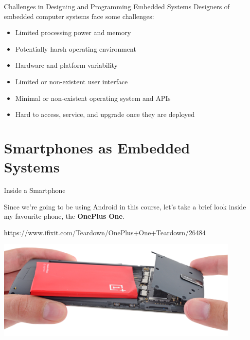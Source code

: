 \documentclass[aspectratio=169]{beamer}
\begin{document}
\begin{frame}{Challenges in Designing and Programming Embedded Systems}
Designers of embedded computer systems face some challenges: \\
\begin{itemize}
\item Limited processing power and memory
\item Potentially harsh operating environment
\item Hardware and platform variability
\item Limited or non-existent user interface
\item Minimal or non-existent operating system and APIs
\item Hard to access, service, and upgrade once they are deployed
\end{itemize}
\end{frame}



\section{Smartphones as Embedded Systems}	



	\begin{frame}{Inside a Smartphone}
		
		Since we're going to be using Android in this course, let's take a brief look
		inside my favourite phone, the {\bf OnePlus One}.
		
		\href{https://www.ifixit.com/Teardown/OnePlus+One+Teardown/26484}{https://www.ifixit.com/Teardown/OnePlus+One+Teardown/26484}
		
		\vspace{1em}		
		
		\centering
		\includegraphics[width=\textwidth,height=5cm,keepaspectratio]{img/WJweKyYej2qtrc4m_small.png}
			
	\end{frame}
\end{document}
